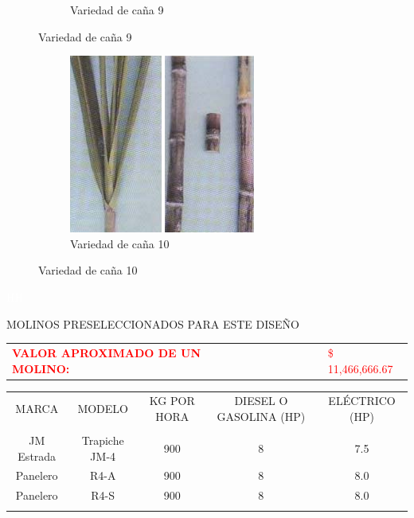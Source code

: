 \documentclass{article}%
\begin{document}
\begin{figure}[h!]
\begin{subfigure}{0.33\linewidth}
\caption{Variedad de caña 9}%
\end{subfigure}%
\linebreak%
\newpage%
\end{figure}

%


\begin{figure}[h!]%
\begin{subfigure}{0.33\linewidth}%
\includegraphics[width=0.95\linewidth]{Cana/MEX64-1487.png}%
\caption{Variedad de caña 10}%
\end{subfigure}%
\linebreak%
\newpage%
\end{figure}

%
\newpage%
\textcolor{white}{ 
HH
}%
\newpage%
\begin{center}%
\begin{Huge}%
MOLINOS PRESELECCIONADOS PARA ESTE DISEÑO%
\end{Huge}%
\linebreak%
\end{center}%
\begin{tabular}{lcccccl}%
\textcolor{red}{ 
\textbf{VALOR APROXIMADO DE UN MOLINO: }
}& & & & & &\textcolor{red}{ 
\$ 11,466,666.67
}\\%
\end{tabular}%
\linebreak%
\begin{tabular}{ccccc}%
MARCA&MODELO&KG POR HORA&DIESEL O GASOLINA (HP)&ELÉCTRICO (HP)\\%
&&&&\\%
JM Estrada&Trapiche JM{-}4&900&8&7.5\\%
Panelero&R4{-}A&900&8&8.0\\%
Panelero&R4{-}S&900&8&8.0\\%
\linebreak%
\newline%
%
\linebreak%
\end{tabular}%
\end{document}
